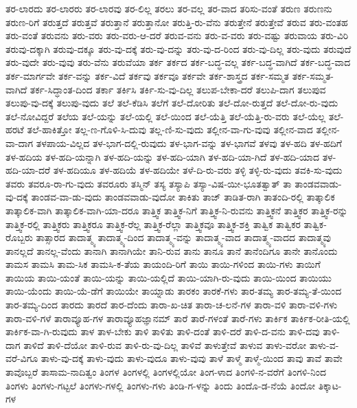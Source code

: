 {ತರ-ಲಾರದು
ತರ-ಲಾರರು
ತರ-ಲಾರವು
ತರ-ಲಿಲ್ಲ
ತರಲು
ತರ-ವಲ್ಲ
ತರ-ವಾದ
ತರಿಸು-ವಂತೆ
ತರುಣ
ತರುಣನು
ತರುಣ-ರಿಗೆ
ತರುತ್ತದೆ
ತರುತ್ತವೆ
ತರುತ್ತಾನೆ
ತರುತ್ತಾನೋ
ತರುತ್ತಿ-ರು-ವೆನು
ತರುತ್ತೇನೆ
ತರುತ್ತೇವೆ
ತರುವ
ತರು-ವಂತಹ
ತರು-ವಂತೆ
ತರುವನು
ತರು-ವರು
ತರು-ವರು-ಆ-ದರೆ
ತರುವ-ವನು
ತರು-ವ-ವರು
ತರು-ವಷ್ಟು
ತರುವಾಯ
ತರು-ವಿರಿ
ತರುವು-ದಕ್ಕಾಗಿ
ತರುವು-ದಕ್ಕೂ
ತರು-ವು-ದಕ್ಕೆ
ತರು-ವು-ದನ್ನು
ತರು-ವು-ದ-ರಿಂದ
ತರು-ವು-ದಿಲ್ಲ
ತರು-ವುದು
ತರುವುದೆ
ತರು-ವುದೇ
ತರು-ವುವು
ತರು-ವೆನು
ತರುವೆಯಾ
ತರ್ಕ
ತರ್ಕದ
ತರ್ಕ-ಬದ್ಧ-ವಲ್ಲ
ತರ್ಕ-ಬದ್ಧ-ವಾಗಿದೆ
ತರ್ಕ-ಬದ್ಧ-ವಾದ
ತರ್ಕ-ಮಾರ್ಗವೇ
ತರ್ಕ-ವನ್ನು
ತರ್ಕ-ವಿದೆ
ತರ್ಕವು
ತರ್ಕವೂ
ತರ್ಕವೇ
ತರ್ಕ-ಶಾಸ್ತ್ರದ
ತರ್ಕ-ಸಮ್ಮತ
ತರ್ಕ-ಸಮ್ಮತ-ವಾಗಿದೆ
ತರ್ಕ-ಸಿದ್ಧಾಂತ-ದಿಂದ
ತರ್ಕಾ
ತರ್ಕಿಸಿ
ತರ್ಕಿ-ಸು-ವು-ದಿಲ್ಲ
ತಲುಪ-ಬೇಕಾ-ದರೆ
ತಲುಪಿ-ದಾಗ
ತಲುಪುವ
ತಲುಪು-ವು-ದಕ್ಕೆ
ತಲುಪು-ವುದು
ತಲೆ
ತಲೆ-ಕೆಡಿಸಿ
ತಲೆಗೆ
ತಲೆ-ದೋರಿತು
ತಲೆ-ದೋ-ರುತ್ತದೆ
ತಲೆ-ದೋ-ರು-ವುದು
ತಲೆ-ನೋವಿದ್ದರೆ
ತಲೆಯ
ತಲೆ-ಯನ್ನು
ತಲೆ-ಯಲ್ಲಿ
ತಲೆ-ಯಿಂದ
ತಲೆ-ಯೆತ್ತಿ
ತಲೆ-ಯೆತ್ತಿ-ರು-ವರು
ತಲೆ-ಯೆಲ್ಲ
ತಲೆ-ಹರಟೆ
ತಲೆ-ಹಾಕಿತ್ತೋ
ತಲ್ಲ-ಣ-ಗೊಳಿ-ಸಿ-ದುವು
ತಲ್ಲ-ಣಿ-ಸು-ವುದು
ತಲ್ಲೀನ-ವಾ-ಗು-ವುವು
ತಲ್ಲೀನ-ವಾದ
ತಲ್ಲೀನ-ವಾ-ದಾಗ
ತಳಪಾಯ-ವಿಲ್ಲದ
ತಳ-ಭಾಗ-ದಲ್ಲಿ-ರುವುದು
ತಳ-ಭಾಗ-ವನ್ನು
ತಳ-ಭಾಗವೆ
ತಳವು
ತಳ-ಹದಿ
ತಳ-ಹದಿಗೆ
ತಳ-ಹದಿಯ
ತಳ-ಹದಿ-ಯನ್ನಾಗಿ
ತಳ-ಹದಿ-ಯನ್ನು
ತಳ-ಹದಿ-ಯಾಗಿ
ತಳ-ಹದಿ-ಯಾ-ಗಿದೆ
ತಳ-ಹದಿ-ಯಾದ
ತಳ-ಹದಿ-ಯಾ-ದರೆ
ತಳ-ಹದಿಯೂ
ತಳ-ಹದಿಯೆ
ತಳ-ಹದಿಯೇ
ತಳೆ-ದಿ-ರು-ವರು
ತಳ್ಳಿ
ತಳ್ಳಿ-ರು-ವುದು
ತವಕಿ-ಸು-ವುದು
ತವರು
ತವರೂ-ರಾ-ಗು-ವುದು
ತವರೂರು
ತಸ್ಮಿನ್
ತಸ್ಯ
ತಸ್ಯಾಪಿ
ತಸ್ಯಾ-ವಿಷ-ಯೀ-ಭೂತತ್ವಾತ್
ತಾ
ತಾಂಡವವಾಡು-ವು-ದಕ್ಕೆ
ತಾಂಡವ-ವಾ-ಡು-ವುದು
ತಾಂಡವವಾಡು-ವುದೋ
ತಾಕಿತು
ತಾಜ್
ತಾಡಿತ-ರಾಗಿ
ತಾತಂದಿ-ರಲ್ಲಿ
ತಾತ್ಕಾಲಿಕ
ತಾತ್ಕಾಲಿಕ-ವಾಗಿ
ತಾತ್ಕಾಲಿಕ-ವಾಗಿ-ಯಾ-ದರೂ
ತಾತ್ತ್ವಿಕ
ತಾತ್ತ್ವಿಕ-ನಿಗೆ
ತಾತ್ತ್ವಿಕ-ನಿ-ರುವನು
ತಾತ್ತ್ವಿಕನೆ
ತಾತ್ತ್ವಿಕರ
ತಾತ್ತ್ವಿಕ-ರನ್ನು
ತಾತ್ತ್ವಿಕ-ರಲ್ಲಿ
ತಾತ್ತ್ವಿಕರು
ತಾತ್ತ್ವಿಕರೂ
ತಾತ್ತ್ವಿಕ-ರೆಲ್ಲ
ತಾತ್ತ್ವಿಕ-ರೆಲ್ಲಾ
ತಾತ್ತ್ವಿಕವೂ
ತಾತ್ತ್ವಿಕ-ಶಕ್ತಿ
ತಾತ್ವಿಕ
ತಾತ್ವಿಕರ
ತಾತ್ವಿಕ-ರೊಬ್ಬರು
ತಾತ್ಸಾರದ
ತಾದಾತ್ಮ್ಯ
ತಾದಾತ್ಮ್ಯ-ದಿಂದ
ತಾದಾತ್ಮ್ಯ-ವನ್ನು
ತಾದಾತ್ಮ್ಯ-ವಾದ
ತಾದಾತ್ಮ್ಯ-ವಾದದ
ತಾದಾತ್ಮ್ಯವು
ತಾನಲ್ಲದೆ
ತಾನಲ್ಲ-ವೆಂದು
ತಾನಾಗಿ
ತಾನಾಗಿಯೇ
ತಾನಿ-ರುವ
ತಾನು
ತಾನೂ
ತಾನೆ
ತಾನೆಂದಿಗೂ
ತಾನೇ
ತಾನೊಂದು
ತಾಮಸ
ತಾಮಸಿ
ತಾಮ-ಸಿಕ
ತಾಮಸಿ-ಕ-ತೆಯ
ತಾಯಂದಿ-ರಿಗೆ
ತಾಯಿ
ತಾಯಿ-ಗಳಿಂದ
ತಾಯಿ-ಗಳು
ತಾಯಿಗೆ
ತಾಯಿಯ
ತಾಯಿ-ಯಂತೆ
ತಾಯಿ-ಯನ್ನು
ತಾಯಿ-ಯಲ್ಲಿದೆ
ತಾಯಿ-ಯಾಗಿ-ರು-ವುದು
ತಾಯಿ-ಯಿಂದ
ತಾಯಿಯು
ತಾಯಿ-ಯೆಂದು
ತಾಯಿ-ಯೆ-ಡೆಗೆ
ತಾಯಿಯೇ
ತಾಯ್ನಾಡು
ತಾರಕಂ
ತಾರಕೆ-ಗಳು
ತಾರ-ತಮ್ಯ
ತಾರ-ತಮ್ಯ-ತೆ-ಯಿಂದ
ತಾರ-ತಮ್ಯ-ದಿಂದ
ತಾರದು
ತಾರದೆ
ತಾರ-ದೆಂದು
ತಾರಾ-ಖ-ಚಿತ
ತಾರಾ-ಚ-ಲನೆ-ಗಳ
ತಾರಾ-ವಳಿ
ತಾರಾ-ವಳಿ-ಗಳು
ತಾರಾ-ವಳಿ-ಗಳೆ
ತಾರಾವ್ಯೂಹ-ಗಳ
ತಾರಾವ್ಯೂಹಜ್ಞಾನಮ್
ತಾರೆ
ತಾರೆ-ಗಳಂತೆ
ತಾರೆ-ಗಳು
ತಾರ್ಕಿಕ
ತಾರ್ಕಿಕ-ರೀತಿ-ಯಲ್ಲಿ
ತಾರ್ಕಿಕ-ವಾ-ಗಿ-ರುವುದು
ತಾಳ
ತಾಳ-ಬೇಕು
ತಾಳಿ
ತಾಳಿತು
ತಾಳಿ-ದಂತೆ
ತಾಳಿ-ದರೆ
ತಾಳಿ-ದ-ವನು
ತಾಳಿ-ದವು
ತಾಳಿ-ದಾಗ
ತಾಳಿದೆ
ತಾಳಿ-ದೆಯೋ
ತಾಳಿ-ರುವ
ತಾಳಿ-ರು-ವು-ದಿಲ್ಲ
ತಾಳಿವೆ
ತಾಳುತ್ತೇವೆ
ತಾಳುವ
ತಾಳು-ವರೋ
ತಾಳು-ವ-ವರೆ-ವಿಗೂ
ತಾಳು-ವು-ದಕ್ಕೆ
ತಾಳು-ವುದು
ತಾಳು-ವುದೂ
ತಾಳು-ವುವು
ತಾಳೆ
ತಾಳ್ಮೆ
ತಾಳ್ಮೆ-ಯಿಂದ
ತಾವು
ತಾವೆ
ತಾವೇ
ತಾವೊಬ್ಬರೆ
ತಾಸಾಮ-ನಾದಿತ್ವಂ
ತಿಂಗಳ
ತಿಂಗಳಲ್ಲಿ
ತಿಂಗಳಲ್ಲಿಯೋ
ತಿಂಗ-ಳಾದ
ತಿಂಗಳಿ-ನ-ವರೆಗೆ
ತಿಂಗಳಿ-ನಿಂದ
ತಿಂಗಳು
ತಿಂಗಳು-ಗಟ್ಟಲೆ
ತಿಂಗಳು-ಗಳಲ್ಲಿ
ತಿಂಗಳು-ಗಳು
ತಿಂಡಿ-ಗ-ಳನ್ನು
ತಿಂದು
ತಿಂದೊ-ಡ-ನೆಯೆ
ತಿಂದೋ
ತಿಕ್ಕಾಟ-ಗಳ
}
